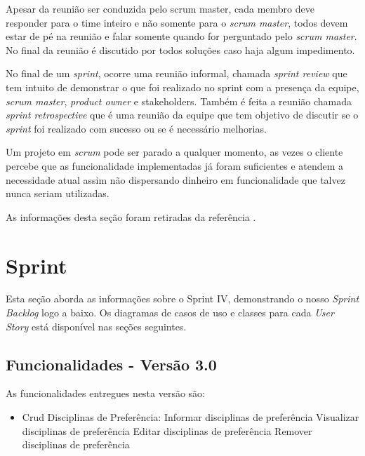 \documentclass{abnt}
\begin{document}
			Apesar da reunião ser conduzida pelo scrum master, cada membro deve responder para o time inteiro e não somente para o
			\emph{scrum master}, todos devem estar de pé na reunião e falar somente quando for perguntado pelo \emph{scrum master}. No final da
			reunião é discutido por todos soluções caso haja algum impedimento.
			
			No final de um \emph{sprint}, ocorre uma reunião informal, chamada \emph{sprint review} que tem intuito de demonstrar o que foi 
			realizado no sprint com a presença da equipe, \emph{scrum master}, \emph{product owner} e stakeholders. Também é feita a reunião chamada \emph{sprint retrospective}
			que é uma reunião da equipe que tem objetivo de discutir se o \emph{sprint} foi realizado com sucesso ou se é necessário melhorias.
			
			Um projeto em \emph{scrum} pode ser parado a qualquer momento, as vezes o cliente percebe que as funcionalidade implementadas já foram
			suficientes e atendem a necessidade atual assim não dispersando dinheiro em funcionalidade que talvez nunca seriam utilizadas.
			
			As informações desta seção foram retiradas da referência \cite{SCRUMEPF}.
	
		
		

\clearpage

\chapter{Sprint}
	
		Esta seção aborda as informações sobre o Sprint IV, demonstrando o nosso \emph{Sprint Backlog} logo a baixo. Os diagramas de casos de uso e classes para cada \emph{User Story} está disponível nas seções seguintes.
	
			
		\section{Funcionalidades - Versão 3.0}
		
			As funcionalidades entregues nesta versão são:
		
			\begin{itemize} 
			
			\item Crud Disciplinas de Preferência:
			\subitem Informar disciplinas de preferência
			\subitem Visualizar disciplinas de preferência
			\subitem Editar disciplinas de preferência
			\subitem Remover disciplinas de preferência
			
			\end{itemize}
			
\end{document}
